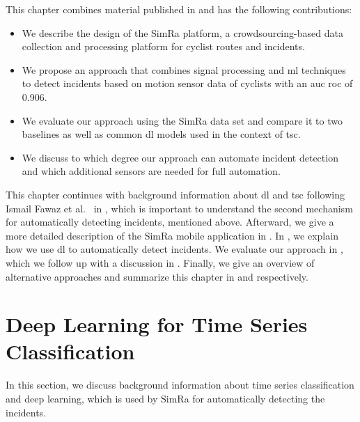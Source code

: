 This chapter combines material published in \cite{karakaya2020simra,karakaya2022cyclesense} and has the following contributions:
\begin{itemize}
\item We describe the design of the SimRa platform, a crowdsourcing-based data collection and processing platform for cyclist routes and incidents.
\item We propose an approach that combines signal processing and \ac{ml} techniques to detect incidents based on motion sensor data of cyclists with an \ac{auc} \ac{roc} of 0.906.
\item We evaluate our approach using the SimRa data set and compare it to two baselines as well as common \acl{dl} models used in the context of \acl{tsc}.
\item We discuss to which degree our approach can automate incident detection and which additional sensors are needed for full automation.
\end{itemize}

This chapter continues with background information about \ac{dl} and \ac{tsc} following Ismail Fawaz et al.~\cite{ismail2019deep} in , which is important to understand the second mechanism for automatically detecting incidents, mentioned above.
Afterward, we give a more detailed description of the SimRa mobile application in .
In , we explain how we use \ac{dl} to automatically detect incidents.
We evaluate our approach in , which we follow up with a discussion in .
Finally, we give an overview of alternative approaches and summarize this chapter in  and  respectively.

\section{Deep Learning for Time Series Classification}
\label{sec:deep_learning_background}
In this section, we discuss background information about time series classification and deep learning, which is used by SimRa for automatically detecting the incidents.


